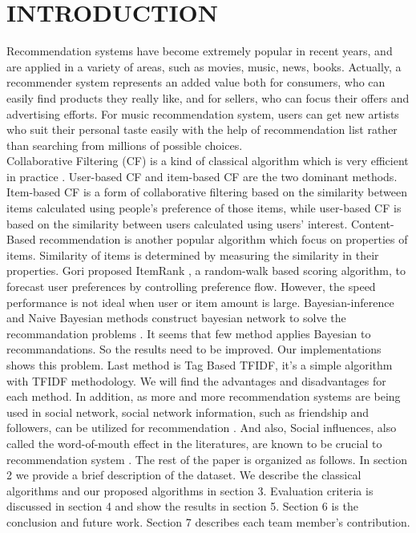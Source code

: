 \documentclass{sig-alternate}
\begin{document}
\section{INTRODUCTION}
Recommendation systems \cite{rs} have become extremely popular in recent years, and are applied in a variety of areas, such as movies, music, news, books. Actually, a recommender system represents an added value both for consumers, who can easily find products they really like, and for sellers, who can focus their offers and advertising efforts. For music recommendation system,  users can get new artists who suit their personal taste easily with the help of recommendation list rather than searching from millions of possible choices.\\
\indent Collaborative Filtering (CF) is a kind of classical algorithm which is very efficient in practice \cite{amazon}. User-based CF and item-based CF are the two dominant methods. Item-based CF \cite{itembase} is a form of collaborative filtering based on the similarity between items calculated using people's preference of those items, while user-based CF is based on the similarity between users calculated using users' interest. Content-Based recommendation \cite{contentbase, content2} is another popular algorithm which focus on properties of items. Similarity of items is determined by measuring the similarity in their properties. Gori proposed ItemRank \cite{itemrank}, a random-walk based scoring algorithm,  to forecast user preferences by controlling preference flow. However, the speed performance is not ideal when user or item amount is large. 
Bayesian-inference and Naive Bayesian methods construct bayesian network to solve the recommandation problems \cite{bayesianinference}\cite{naivebayesian}.  It seems that few method applies Bayesian to recommandations.  So the results need to be improved.  Our implementations shows this problem.  Last method is Tag Based TFIDF, it's a simple algorithm with TFIDF methodology\cite{tfidf}.  We will find the advantages and disadvantages for each method.  
In addition, as more and more recommendation systems are being used in social network, social network information, such as friendship and followers, can be utilized for recommendation \cite{socialmodel}. And also, Social influences, also called the word-of-mouth effect in the literatures, are known to
be crucial to recommendation system \cite{influence}.
\indent The rest of the paper is organized as follows. In section 2 we provide a brief description of the dataset. We describe the classical algorithms and our proposed algorithms in section 3. Evaluation criteria is discussed in section 4 and show the results in section 5. Section 6 is the conclusion and future work. Section 7 describes each team member's contribution.
\end{document}
